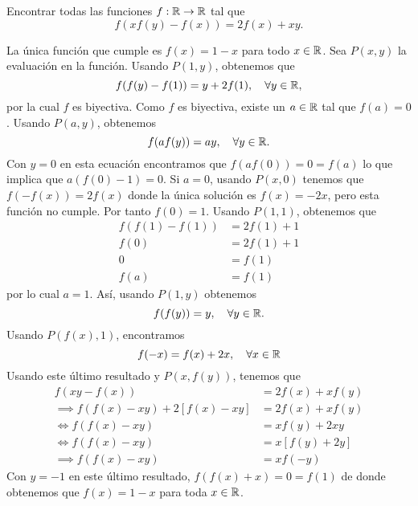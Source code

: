 \begin{example}
    Encontrar todas las funciones $f: \mathbb{R} \to \mathbb{R}$ tal que
    \[
        f(xf(y) - f(x)) = 2f(x) + xy.
    \]
\end{example}
\begin{solution*}
    La única función que cumple es $f(x) = 1 - x$ para todo $x \in \mathbb{R}$.
    Sea $P(x,y)$ la evaluación en la función.
    Usando $P(1,y)$, obtenemos que
    \[
        f(f(y) - f(1)) = y + 2f(1),\quad \forall y \in \mathbb{R},
    \]
    por la cual $f$ es biyectiva.
    Como $f$ es biyectiva, existe un $a \in \mathbb{R}$ tal que $f(a) = 0$.
    Usando $P(a,y)$, obtenemos
    \[
        f(af(y)) = ay, \quad \forall y \in \mathbb{R}.
    \]
    Con $y = 0$ en esta ecuación encontramos que $f(af(0)) = 0 = f(a)$ lo que implica que $a (f(0) - 1) = 0$.
    Si $a = 0$, usando $P(x,0)$ tenemos que $f(-f(x)) = 2f(x)$ donde la única solución es $f(x) = -2x$, pero esta función no cumple.
    Por tanto $f(0) = 1$.
    Usando $P(1,1)$, obtenemos que
    \begin{align*}
        f(f(1) - f(1)) &= 2f(1) + 1 \\
        f(0) &= 2f(1) + 1 \\
        0 &= f(1)\\
        f(a) &= f(1)
    \end{align*}
    por lo cual $a = 1$.
    Así, usando $P(1,y)$ obtenemos
    \[
        f(f(y)) = y, \quad \forall y \in \mathbb{R}.
    \]
    Usando $P(f(x),1)$, encontramos
    \[
        f(-x) = f(x) + 2x, \quad \forall x \in \mathbb{R}
    \]
    Usando este último resultado y $P(x, f(y))$, tenemos que
    \begin{align*}
        f(xy - f(x)) &= 2f(x) + xf(y)\\
        \implies f(f(x) - xy) + 2\left[f(x) - xy\right] &= 2f(x) + xf(y)\\
        \iff f(f(x) - xy) &= xf(y) + 2xy\\
        \iff f(f(x) - xy) &= x\left[f(y) + 2y\right]\\
        \implies f(f(x) - xy) &= xf(-y)
    \end{align*}
    Con $y = -1$ en este último resultado, $f(f(x) + x) = 0 = f(1)$ de donde obtenemos que $f(x) = 1 - x$ para toda $x \in \mathbb{R}$.
\end{solution*}